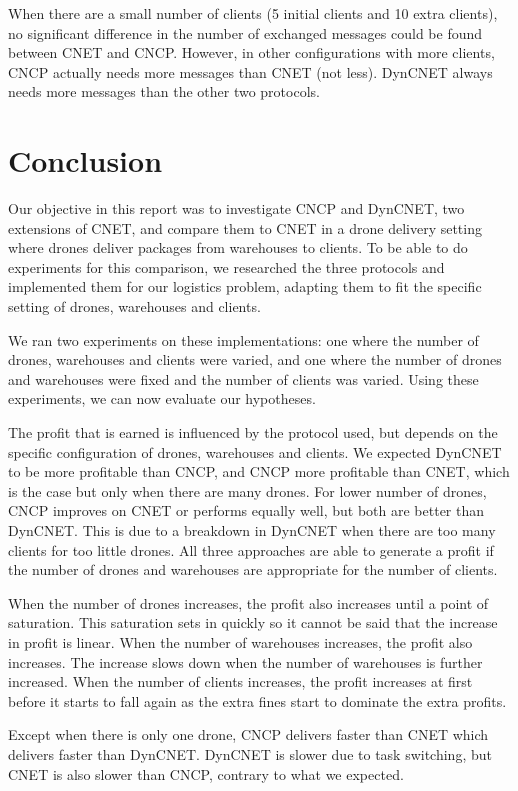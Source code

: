 \documentclass[10pt,a4paper,twocolumn]{article}
\begin{document}
When there are a small number of clients (5 initial clients and 10 extra clients), no significant difference in the number of exchanged messages could be found between CNET and CNCP. However, in other configurations with more clients, CNCP actually needs more messages than CNET (not less). DynCNET always needs more messages than the other two protocols.

\section{Conclusion}
Our objective in this report was to investigate CNCP and DynCNET, two extensions of CNET, and compare them to CNET in a drone delivery setting where drones deliver packages from warehouses to clients. To be able to do experiments for this comparison, we researched the three protocols and implemented them for our logistics problem, adapting them to fit the specific setting of drones, warehouses and clients.

We ran two experiments on these implementations: one where the number of drones, warehouses and clients were varied, and one where the number of drones and warehouses were fixed and the number of clients was varied. Using these experiments, we can now evaluate our hypotheses.

The profit that is earned is influenced by the protocol used, but depends on the specific configuration of drones, warehouses and clients. We expected DynCNET to be more profitable than CNCP, and CNCP more profitable than CNET, which is the case but only when there are many drones. For lower number of drones, CNCP improves on CNET or performs equally well, but both are better than DynCNET. This is due to a breakdown in DynCNET when there are too many clients for too little drones. All three approaches are able to generate a profit if the number of drones and warehouses are appropriate for the number of clients.

When the number of drones increases, the profit also increases until a point of saturation. This saturation sets in quickly so it cannot be said that the increase in profit is linear. When the number of warehouses increases, the profit also increases. The increase slows down when the number of warehouses is further increased. When the number of clients increases, the profit increases at first before it starts to fall again as the extra fines start to dominate the extra profits.

Except when there is only one drone, CNCP delivers faster than CNET which delivers faster than DynCNET. DynCNET is slower due to task switching, but CNET is also slower than CNCP, contrary to what we expected.
\end{document}
